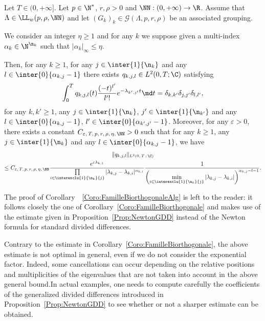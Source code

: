 \begin{coro} \label{Coro:FamilleBiorthogonaleAlg}
Let $T \in (0,+\infty]$. Let $p \in \N^*$, $r, \rho > 0$ and $\NN : (0,+\infty) \to \R$. Assume that $\Lambda \in \LL_w(p,\rho, \NN)$ and let $(G_k)_k\in \mathcal{G}(\Lambda,p,r,\rho)$ be an associated grouping.

We consider an integer $\eta \geq 1$ and for any $k$ we suppose given a multi-index $\alpha_k\in \N^{\n_k}$ such that $|\alpha_k|_\infty\leq \eta$.

Then, for any $k \geq 1$, for any $j \in \inter{1}{\n_k}$ and any $l \in \inter{0}{\alpha_{k,j}-1}$ there exists $q_{k,j,l} \in L^2(0,T ; \C)$ satisfying
\begin{equation*}\label{Famille_Biortho_Alg}
\int_0^T q_{k,j,l}(t) \frac{(-t)^{l'}}{l'!} e^{-\lambda_{k',j'} t } \md t = \delta_{k,k'} \delta_{j,j'} \delta_{l,l'},
\end{equation*}
for any $k, k' \geq 1$, any $j \in \inter{1}{\n_{k}}$, $j' \in \inter{1}{\n_{k'}}$ and any $l \in \inter{0}{\alpha_{k,j}-1}$, $l' \in \inter{0}{\alpha_{k',j'}-1}$. Moreover, for any $\varepsilon > 0$, there exists a constant $C_{\varepsilon,\,T,\, p,\, r,\, \rho,\, \eta,\,\NN} >0$ such that for any $k \geq 1$, any $j \in \inter{1}{\n_k}$ and any $l \in \inter{0}{\alpha_{k,j}-1}$, we have
\begin{multline*}\label{Estimee_Famille_Biortho_Alg}
\| q_{k,j,l} \|_{L^2(0,\,T\,;\,\C)} \\ \leq C_{\varepsilon,\,T, \,p,\, r,\, \rho,\, \eta,\, \NN} \frac{e^{\varepsilon \lambda_{k,1}}}{ \prod\limits_{i \in \interexclu{1}{\n_k}{j}} |\lambda_{k,j} - \lambda_{k,i}|^{\alpha_{k,i}}} \frac{1}{\left(\min\limits_{i\in\interexclu{1}{\n_k}{j}} |\lambda_{k,j}-\lambda_{k,i}|\right)^{\alpha_{k,j}-l-1}}.
\end{multline*}
\end{coro}


The proof of Corollary~~\ref{Coro:FamilleBiorthogonaleAlg} is left to the reader: it follows closely the one of Corollary~\ref{Coro:FamilleBiorthogonale} and makes use of the estimate given in Proposition~\ref{Prop:NewtonGDD} instead of the Newton formula for standard divided differences.

\begin{rema}
Contrary to the estimate in Corollary~\ref{Coro:FamilleBiorthogonale}, the above estimate is not optimal in general, even if we do not consider the exponential factor. Indeed, some cancellations can occur depending on the relative positions and multiplicities of the eigenvalues that are not taken into account in the above general bound.\linebreak In actual examples, one needs to compute carefully the coefficients of the generalized divided differences introduced in Proposition~\ref{Prop:NewtonGDD} to see whether or not a sharper estimate can be obtained.
\end{rema}


